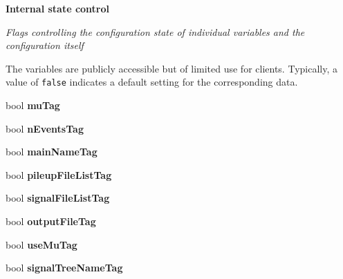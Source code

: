 \begin{Indent}{\bf Internal state control}\par
{\em Flags controlling the configuration state of individual variables and the configuration itself

The variables are publicly accessible but of limited use for clients. Typically, a value of {\tt false} indicates a default setting for the corresponding data. }\begin{CompactItemize}
\item 
\hypertarget{classConfiguration_1_1ConfigData_e57edbd37ba17dd082f2627cb08f2874}{
bool \textbf{mu\-Tag}}
\label{classConfiguration_1_1ConfigData_e57edbd37ba17dd082f2627cb08f2874}

\item 
\hypertarget{classConfiguration_1_1ConfigData_1e7b0e92998c5765c305160ff28dfb0d}{
bool \textbf{n\-Events\-Tag}}
\label{classConfiguration_1_1ConfigData_1e7b0e92998c5765c305160ff28dfb0d}

\item 
\hypertarget{classConfiguration_1_1ConfigData_ef61f23f740b4a11764a4ddaff8b15f3}{
bool \textbf{main\-Name\-Tag}}
\label{classConfiguration_1_1ConfigData_ef61f23f740b4a11764a4ddaff8b15f3}

\item 
\hypertarget{classConfiguration_1_1ConfigData_b05fd7162fd73c45468693cb03f45957}{
bool \textbf{pileup\-File\-List\-Tag}}
\label{classConfiguration_1_1ConfigData_b05fd7162fd73c45468693cb03f45957}

\item 
\hypertarget{classConfiguration_1_1ConfigData_f878529b4dc16bc6ce87c11b46e1da2d}{
bool \textbf{signal\-File\-List\-Tag}}
\label{classConfiguration_1_1ConfigData_f878529b4dc16bc6ce87c11b46e1da2d}

\item 
\hypertarget{classConfiguration_1_1ConfigData_03980d9073936a5a9c75a5ea73b83d46}{
bool \textbf{output\-File\-Tag}}
\label{classConfiguration_1_1ConfigData_03980d9073936a5a9c75a5ea73b83d46}

\item 
\hypertarget{classConfiguration_1_1ConfigData_62fde1c835a7ae553b8ca0392a1bacb1}{
bool \textbf{use\-Mu\-Tag}}
\label{classConfiguration_1_1ConfigData_62fde1c835a7ae553b8ca0392a1bacb1}

\item 
\hypertarget{classConfiguration_1_1ConfigData_70aa880a39f0cb6512cde3265e76a29e}{
bool \textbf{signal\-Tree\-Name\-Tag}}
\label{classConfiguration_1_1ConfigData_70aa880a39f0cb6512cde3265e76a29e}


\end{CompactItemize}
\end{Indent}
